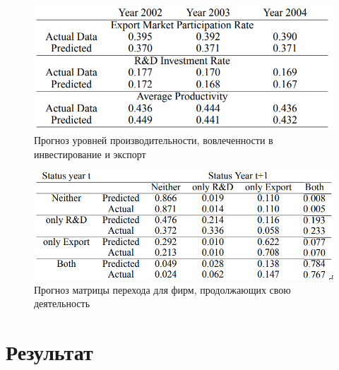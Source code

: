\documentclass[c, dvipsnames]{beamer}  %
\begin{document}
\begin{frame}[shrink=3]
\frametitle{\insertsection} 


\begin{figure}
	\centering
	\includegraphics[width=0.7\linewidth]{screenshot012}
	\caption{Прогноз уровней производительности, вовлеченности в инвестирование и экспорт}
	\label{fig:screenshot012}
\end{figure}

\begin{figure}
	\centering
	\includegraphics[width=0.7\linewidth]{screenshot013}
	\caption{Прогноз матрицы перехода для фирм, продолжающих свою деятельность }
	\label{fig:screenshot013}
\end{figure}


\end{frame}


\section{Результат}
\end{document}

